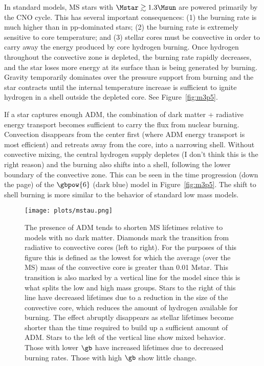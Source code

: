 In standard models, MS stars with $\Mstar \gtrsim 1.3 \Msun$ are powered primarily by the CNO cycle.
This has several important consequences:
(1) the burning rate is much higher than in pp-dominated stars;
(2) the burning rate is extremely sensitive to core temperature;
and (3) stellar cores must be convective in order to carry away the energy produced by core hydrogen burning.
Once hydrogen throughout the convective zone is depleted, the burning rate rapidly decreases, and the star loses more energy at its surface than is being generated by burning. Gravity temporarily dominates over the pressure support from burning and the star contracts until the internal temperature increase is sufficient to ignite hydrogen in a shell outside the depleted core. See Figure~\ref{fig:m3p5}.

If a star captures enough ADM, the combination of dark matter + radiative energy transport becomes sufficient to carry the flux from nuclear burning. Convection disappears from the center first (where ADM energy transport is most efficient) and retreats away from the core, into a narrowing shell. Without convective mixing, the central hydrogen supply depletes (I don't think this is the right reason) and the burning also shifts into a shell, following the lower boundary of the convective zone. This can be seen in the time progression (down the page) of the $\gbpow{6}$ (dark blue) model in Figure~\ref{fig:m3p5}. The shift to shell burning is more similar to the behavior of standard low mass models.


\begin{figure*}
  \centering
  \texttt{[image: plots/mstau.png]}
  \caption{The presence of ADM tends to shorten MS lifetimes relative to models with no dark matter.
  Diamonds mark the transition from radiative to convective cores (left to right). For the purposes of this figure this is defined as the lowest \Mstar for which the average (over the MS) mass of the convective core is greater than 0.01 Mstar. This transition is also marked by a vertical line for the \nodm model since this is what splits the low and high mass groups. Stars to the right of this line have decreased lifetimes due to a reduction in the size of the convective core, which reduces the amount of hydrogen available for burning. The effect abruptly disappears as stellar lifetimes become shorter than the time required to build up a sufficient amount of ADM. Stars to the left of the vertical line show mixed behavior. Those with lower $\gb$ have increased lifetimes due to decreased burning rates. Those with high $\gb$ show little change.
  }
  \label{fig:mstau}
\end{figure*}

